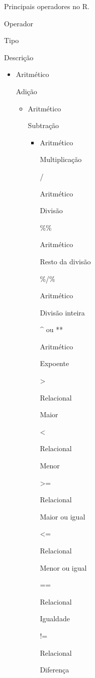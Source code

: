 \documentclass[
]{article}
\begin{document}
\label{tab:tab-operadores}Principais operadores no R.

Operador

Tipo

Descrição

\begin{itemize}
\item
  Aritmético

  Adição

  \begin{itemize}
  \item
    Aritmético

    Subtração

    \begin{itemize}
    \item
      Aritmético

      Multiplicação

      /

      Aritmético

      Divisão

      \%\%

      Aritmético

      Resto da divisão

      \%/\%

      Aritmético

      Divisão inteira

      \^{} ou **

      Aritmético

      Expoente

      \textgreater{}

      Relacional

      Maior

      \textless{}

      Relacional

      Menor

      \textgreater=

      Relacional

      Maior ou igual

      \textless=

      Relacional

      Menor ou igual

      ==

      Relacional

      Igualdade

      !=

      Relacional

      Diferença


\end{itemize}
\end{itemize}
\end{itemize}
\end{document}
